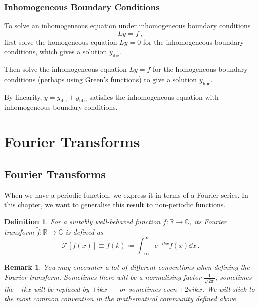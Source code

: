 \documentclass{article}
\theoremstyle{plain}\theoremheaderfont{\normalfont\itshape}\theorembodyfont{\rmfamily}\theoremseparator{.}\newtheorem*{rem}{Remark}\newtheorem*{ex}{Example}\newtheorem*{proof}{Proof}\newtheorem*{altp}{Alternative proof}
\theoremstyle{plain}\theoremheaderfont{\normalfont\bfseries}\theorembodyfont{\rmfamily}\theoremseparator{.}\newtheorem{thm}{Theorem}[section]\newtheorem{lem}[thm]{Lemma}\newtheorem{prop}[thm]{Proposition}\newtheorem*{cor}{Corollary}\newtheorem{defn}[thm]{Definition}\newtheorem{clm}[thm]{Claim}\newtheorem{clminproof}{Claim}
\theoremstyle{break}\theoremheaderfont{\normalfont\itshape}\theorembodyfont{\rmfamily}\theoremseparator{.\medskip}\newtheorem*{proofskip}{Proof}\newtheorem*{exs}{Examples}\newtheorem*{rems}{Remarks}
\theoremstyle{break}\theoremheaderfont{\normalfont\bfseries}\theorembodyfont{\rmfamily}\theoremseparator{.\medskip}\newtheorem{lemskip}[thm]{Lemma}\newtheorem{defnskip}[thm]{Definition}\newtheorem{propskip}[thm]{Proposition}\newtheorem{thmskip}[thm]{Theorem}
\numberwithin{equation}{section}
\begin{document}
	\subsubsection{Inhomogeneous Boundary Conditions}
	To solve an inhomogeneous equation under inhomogeneous boundary conditions
	\[Ly=f\,,\]
	first solve the homogeneous equation \(Ly=0\) for the inhomogeneous boundary conditions, which gives a solution \(y_{\text{ibc}}\).
	
	Then solve the inhomogeneous equation \(Ly=f\) for the homogeneous boundary conditions (perhaps using Green's functions) to give a solution \(y_{\text{hbc}}\).
	
	By linearity, \(y=y_{\text{ibc}}+y_{\text{hbc}}\) satisfies the inhomogeneous equation with inhomogeneous boundary conditions.

	\newpage

	\section{Fourier Transforms}
	\subsection{Fourier Transforms}
	When we have a periodic function, we express it in terms of a Fourier series. In this chapter, we want to generalise this result to non-periodic functions.
	\begin{defn}
		For a suitably well-behaved function \(f:\mathbb{R}\to\mathbb{C}\), its \textit{Fourier transform} \(\tilde{f}:\mathbb{R}\to\mathbb{C}\) is defined as
		\[\mathcal{F}[f(x)]\equiv\tilde{f}(k)\coloneqq\int_{-\infty}^{\infty}e^{-ikx}f(x)\dd{x}\,.\]
	\end{defn}
	\begin{rem}
		You may encounter a lot of different conventions when defining the Fourier transform. Sometimes there will be a normalising factor \(\frac{1}{\sqrt{2\pi}}\), sometimes the \(-ikx\) will be replaced by \(+ikx\) --- or sometimes even \(\pm 2\pi ikx\). We will stick to the most common convention in the mathematical community defined above.
	\end{rem}
	
\end{document}
